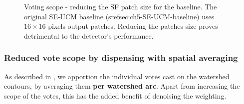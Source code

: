 \begin{figure}[ht!]
\centering
\caption[Voting scope - reducing the SF patch size - plots]{Voting scope - reducing the SF patch size for the baseline. The original SE-UCM baseline (sref{sec:ch5-SE-UCM-baseline}) uses $16\times16$ pixels output patches. Reducing the patches size proves detrimental to %
the detector's performance.}
\label{fig:degraded-baseline}
\end{figure}

\subsubsection{Reduced vote scope by dispensing with spatial averaging}
As described in , we apportion %
the individual votes cast on the watershed contours, by averaging them {\bf per watershed arc}. Apart from increasing the scope of the votes, this has the added benefit of denoising the weighting. 


